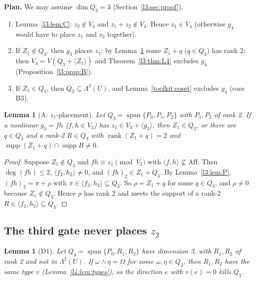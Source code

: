 \documentclass[11pt,a4paper]{article}
\theoremstyle{plain}
\newtheorem{lemma}[theorem]{Lemma}
\theoremstyle{remark}
\newcommand{\Aff}{\mathrm{Aff}}
\newcommand{\Span}{\operatorname{span}}
\newcommand{\supp}{\operatorname{supp}}
\newcommand{\rk}{\operatorname{rank}}
\newcommand{\Lam}{\Lambda^2}
\begin{document}
\noindent\textbf{Plan.} We may assume $\dim Q_3=3$ (Section~\ref{l3:sec:proof}).
\begin{enumerate}[1.]
\item Lemma~\ref{l3:lem:C}: $z_2\notin V_4$ and $z_1+z_2\notin V_4$. Hence $z_1\in V_4$ (otherwise $g_4$ would have to place $z_1$ and $z_2$ together).
\item If $Z_1\notin Q_3$, then $g_3$ places $z_1$; by Lemma~\ref{l3:lem:A} some $Z_1+q$ ($q\in Q_3$) has rank 2; then $V_4=V(Q_3+\langle Z_1\rangle)$ and Theorem~\ref{l3:thm:L4} excludes $g_4$ (Proposition~\ref{l3:prop:B}).
\item If $Z_1\in Q_3$, then $Q_3\subseteq\Lam(U)$, and Lemma~\ref{toolkit:coset} excludes $g_4$ (case B3).
\end{enumerate}

\begin{lemma}[A: $z_1$-placement]\label{l3:lem:A}
Let $Q_3=\Span\{P_0,P_1,P_2\}$ with $P_1,P_2$ of rank 2. If a nonlinear $g_3=fh$ ($f,h\in V_3$) has $z_1\in V_3+\langle g_3\rangle$, then $Z_1\in Q_3$, or there are $q\in Q_3$ and a rank-2 $R\in Q_3$ with $\rk(Z_1+q)=2$ and $\supp(Z_1+q)\cap\supp R\neq0$.
\end{lemma}

\begin{proof}
Suppose $Z_1\notin Q_3$ and $fh\equiv z_1\pmod{V_3}$ with $\langle f,h\rangle\not\subseteq\Aff$. Then $\deg(fh)\le2$, $\langle f_2,h_2\rangle\neq0$, and $(fh)_2\in Z_1+Q_3$. By Lemma~\ref{l3:lem:P}, $(fh)_2=\pi+\rho$ with $\pi\in\langle f_2,h_2\rangle\subseteq Q_3$. So $\rho=Z_1+q$ for some $q\in Q_3$, and $\rho\neq0$ because $Z_1\notin Q_3$. Hence $\rho$ has rank 2 and meets the support of a rank-2 $R\in\langle f_2,h_2\rangle\subseteq Q_3$.
\end{proof}

\subsection[The third gate never places z2]{The third gate never places $z_2$}

\begin{lemma}[D1]\label{l3:lem:D1}
Let $Q_3=\Span\{P_0,R_1,R_2\}$ have dimension 3, with $R_1,R_2$ of rank 2 and not in $\Lam(U)$. If $\omega\wedge\eta=\Omega$ for some $\omega,\eta\in Q_3$, then $R_1,R_2$ have the same type $v$ (Lemma~\ref{l4:lem:types}), so the direction $e$ with $v(e)=0$ kills $Q_3$.
\end{lemma}
\end{document}
